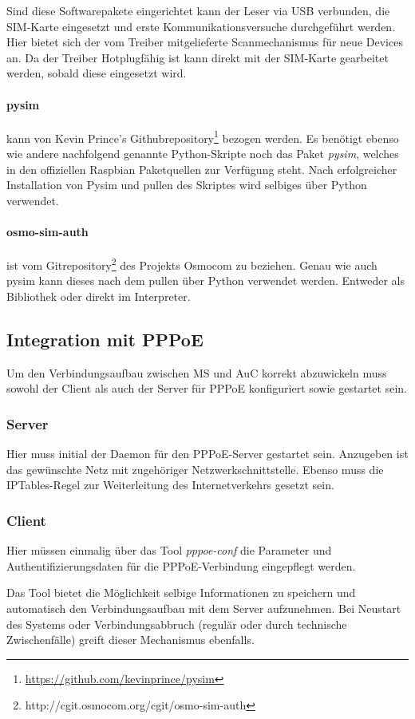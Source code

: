            Sind diese Softwarepakete eingerichtet kann der Leser via USB verbunden, die SIM-Karte eingesetzt
            und erste Kommunikationsversuche durchgeführt werden. Hier bietet sich der vom
            Treiber mitgelieferte Scanmechanismus für neue Devices an. Da der Treiber
            Hotplugfähig ist kann direkt mit der SIM-Karte gearbeitet werden, sobald diese
            eingesetzt wird.

			\paragraph{pysim} kann von Kevin Prince's Githubrepository\footnote{\url{https://github.com/kevinprince/pysim}} bezogen werden. Es benötigt ebenso
            wie andere nachfolgend genannte Python-Skripte noch das Paket \textit{pysim}, welches
            in den offiziellen Raspbian Paketquellen zur Verfügung steht. Nach erfolgreicher Installation
            von Pysim und pullen des Skriptes wird selbiges über Python verwendet.

            \paragraph{osmo-sim-auth} ist vom Gitrepository\footnote{\url{}http://cgit.osmocom.org/cgit/osmo-sim-auth} des Projekts Osmocom zu  beziehen. Genau wie auch pysim kann dieses nach dem pullen
            über Python verwendet werden. Entweder als Bibliothek oder direkt im Interpreter.

	\subsection{Integration mit PPPoE}
        Um den Verbindungsaufbau zwischen \ac{MS} und \ac{AuC} korrekt abzuwickeln muss sowohl der Client
        als auch der Server für \ac{PPPoE} konfiguriert sowie gestartet sein.

		 \subsubsection{Server}
         Hier muss initial der Daemon für den \ac{PPPoE}-Server gestartet sein. Anzugeben ist das gewünschte
         Netz mit zugehöriger Netzwerkschnittstelle. Ebenso muss die IPTables-Regel zur Weiterleitung
         des Internetverkehrs gesetzt sein.

         \subsubsection{Client}
         Hier müssen einmalig über das Tool \textit{pppoe-conf} die Parameter und Authentifizierungsdaten
         für die \ac{PPPoE}-Verbindung eingepflegt werden.

         Das Tool bietet die Möglichkeit selbige Informationen
         zu speichern und automatisch den Verbindungsaufbau mit dem Server aufzunehmen. Bei Neustart
         des Systems oder Verbindungsabbruch (regulär oder durch technische Zwischenfälle) greift dieser
         Mechanismus ebenfalls.

\clearpage
